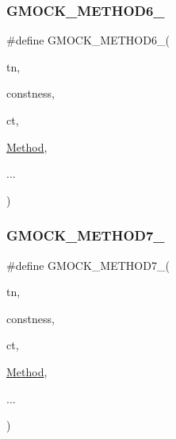 \mbox{\label{_obj__test_2lib_2googletest-release-1_88_81_2googlemock_2include_2gmock_2gmock-generated-function-mockers_8h_ad0ca7f6973a076d0af4c953f8ed91842}} 
\subsubsection{\texorpdfstring{GMOCK\_METHOD6\_}{GMOCK\_METHOD6\_}}
{\footnotesize\ttfamily \#define G\+M\+O\+C\+K\+\_\+\+M\+E\+T\+H\+O\+D6\+\_\+(\begin{DoxyParamCaption}\item[{}]{tn,  }\item[{}]{constness,  }\item[{}]{ct,  }\item[{}]{\mbox{\hyperlink{_obj__test_2lib_2googletest-release-1_88_81_2googlemock_2test_2gmock-spec-builders__test_8cc_a95606368148f3e5aab5db46c32466afd}{Method}},  }\item[{}]{... }\end{DoxyParamCaption})}

\mbox{\label{_obj__test_2lib_2googletest-release-1_88_81_2googlemock_2include_2gmock_2gmock-generated-function-mockers_8h_ab98a8399ba62b53b375c2807f4d39d2f}} 
\subsubsection{\texorpdfstring{GMOCK\_METHOD7\_}{GMOCK\_METHOD7\_}}
{\footnotesize\ttfamily \#define G\+M\+O\+C\+K\+\_\+\+M\+E\+T\+H\+O\+D7\+\_\+(\begin{DoxyParamCaption}\item[{}]{tn,  }\item[{}]{constness,  }\item[{}]{ct,  }\item[{}]{\mbox{\hyperlink{_obj__test_2lib_2googletest-release-1_88_81_2googlemock_2test_2gmock-spec-builders__test_8cc_a95606368148f3e5aab5db46c32466afd}{Method}},  }\item[{}]{... }\end{DoxyParamCaption})}

